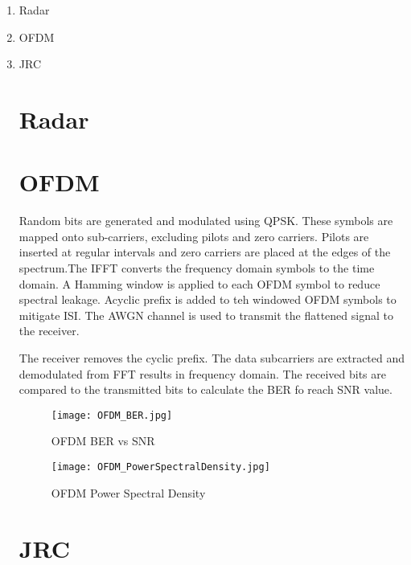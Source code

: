 \documentclass[onecolumn,conference]{IEEEtran}
\begin{document}
	\begin{enumerate}
		\item Radar
          \item OFDM
        \item JRC\par
        
   \section {Radar}

     \section {OFDM}
Random bits are generated and modulated using QPSK. These symbols are mapped onto sub-carriers, excluding pilots and zero carriers.
Pilots are inserted at regular intervals and zero carriers are placed at the edges of the spectrum.The IFFT converts the frequency domain symbols to the time domain. A Hamming window is applied to each OFDM symbol to reduce spectral leakage. Acyclic prefix is added to teh windowed OFDM symbols to mitigate ISI. The AWGN channel is used to transmit the flattened signal to the receiver.\par
The receiver removes the cyclic prefix. The data subcarriers are extracted and demodulated from FFT results in frequency domain. The received bits are compared to the transmitted bits to calculate the BER fo reach SNR value. 
\begin{figure}
    \centering
    \texttt{[image: OFDM\_BER.jpg]}
    \caption{OFDM BER vs SNR}
    \end{figure}
\begin{figure}
        \centering
        \texttt{[image: OFDM\_PowerSpectralDensity.jpg]}
        \caption{OFDM Power Spectral Density}
    \end{figure}
        

  


     \section {JRC}

	\end{enumerate}
	
	\nocite{yang_subcarrier_multiplexing}
	{}
    
  
\end{document}
